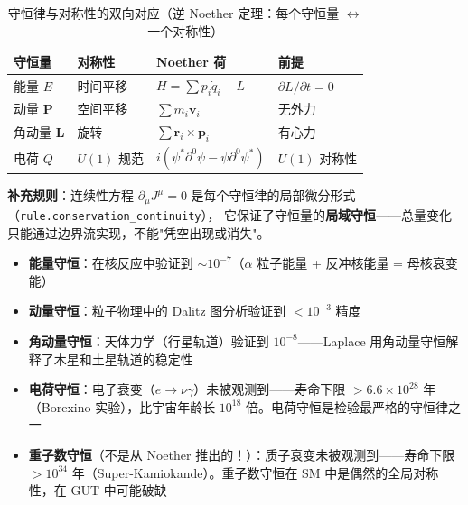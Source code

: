 \begin{table}[h]
\centering
\begin{tabular}{p{3cm}p{3cm}p{3cm}p{3cm}}
\toprule
\textbf{守恒量} & \textbf{对称性} & \textbf{Noether 荷} & \textbf{前提} \\
\midrule
能量 $E$ & 时间平移 & $H = \sum p_i\dot{q}_i - L$ & $\partial L/\partial t = 0$ \\
动量 $\mathbf{P}$ & 空间平移 & $\sum m_i\mathbf{v}_i$ & 无外力 \\
角动量 $\mathbf{L}$ & 旋转 & $\sum\mathbf{r}_i\times\mathbf{p}_i$ & 有心力 \\
电荷 $Q$ & $U(1)$ 规范 & $i(\psi^*\partial^0\psi - \psi\partial^0\psi^*)$ & $U(1)$ 对称性 \\
\bottomrule
\end{tabular}
\caption{守恒律与对称性的双向对应（逆 Noether 定理：每个守恒量 $\leftrightarrow$ 一个对称性）}
\end{table}

\textbf{补充规则}：连续性方程 $\partial_\mu J^\mu = 0$ 是每个守恒律的局部微分形式（\texttt{rule.conservation\_continuity}），
它保证了守恒量的\textbf{局域守恒}——总量变化只能通过边界流实现，不能"凭空出现或消失"。



\begin{oombox}[四大守恒律的实验验证精度]
  \begin{itemize}
    \item \textbf{能量守恒}：在核反应中验证到 $\sim 10^{-7}$（$\alpha$ 粒子能量 + 反冲核能量 = 母核衰变能）
    \item \textbf{动量守恒}：粒子物理中的 Dalitz 图分析验证到 $< 10^{-3}$ 精度
    \item \textbf{角动量守恒}：天体力学（行星轨道）验证到 $10^{-8}$——Laplace 用角动量守恒解释了木星和土星轨道的稳定性
    \item \textbf{电荷守恒}：电子衰变（$e \to \nu\gamma$）未被观测到——寿命下限 $> 6.6\times 10^{28}$ 年（Borexino 实验），比宇宙年龄长 $10^{18}$ 倍。电荷守恒是检验最严格的守恒律之一
    \item \textbf{重子数守恒}（不是从 Noether 推出的！）：质子衰变未被观测到——寿命下限 $> 10^{34}$ 年（Super-Kamiokande）。重子数守恒在 SM 中是偶然的全局对称性，在 GUT 中可能破缺
  \end{itemize}
\end{oombox}

